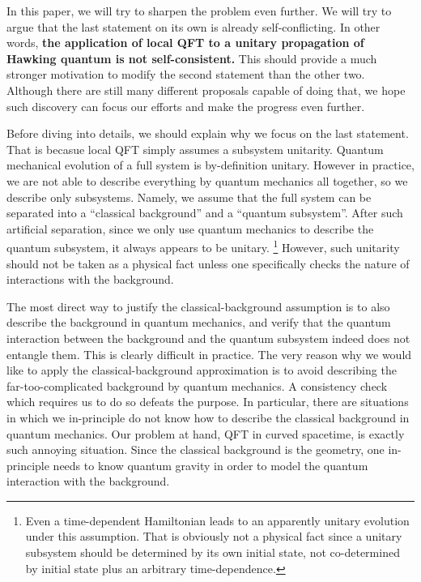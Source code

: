 \documentclass[aps,showpacs,twocolumn,floats,prd,superscriptaddress,nofootinbib]{revtex4-1}
\begin{document}
In this paper, we will try to sharpen the problem even further. 
We will try to argue that the last statement on its own is already self-conflicting. 
In other words, {\bf the application of local QFT to a unitary propagation of Hawking quantum is not self-consistent. } 
This should provide a much stronger motivation to modify the second statement than the other two. 
Although there are still many different proposals capable of doing that, we hope such discovery can focus our efforts and make the progress even further.

Before diving into details, we should explain why we focus on the last statement.
That is becasue local QFT simply assumes a subsystem unitarity.
Quantum mechanical evolution of a full system is by-definition unitary. 
However in practice, we are not able to describe everything by quantum mechanics all together, so we describe only subsystems. 
Namely, we assume that the full system can be separated into a ``classical background'' and a ``quantum subsystem''. 
After such artificial separation, since we only use quantum mechanics to describe the quantum subsystem, it always appears to be unitary.
\footnote{Even a time-dependent Hamiltonian leads to an apparently unitary evolution under this assumption. That is obviously not a physical fact since a unitary subsystem should be determined by its own initial state, not co-determined by initial state plus an arbitrary time-dependence.} 
However, such unitarity should not be taken as a physical fact unless one specifically checks the nature of interactions with the background.

The most direct way to justify the classical-background assumption is to also describe the background in quantum mechanics, and verify that the quantum interaction between the background and the quantum subsystem indeed does not entangle them. 
This is clearly difficult in practice. 
The very reason why we would like to apply the classical-background approximation is to avoid describing the far-too-complicated background by quantum mechanics. 
A consistency check which requires us to do so defeats the purpose. 
In particular, there are situations in which we in-principle do not know how to describe the classical background in quantum mechanics. 
Our problem at hand, QFT in curved spacetime, is exactly such annoying situation. 
Since the classical background is the geometry, one in-principle needs to know quantum gravity in order to model the quantum interaction with the background. 
\end{document}
